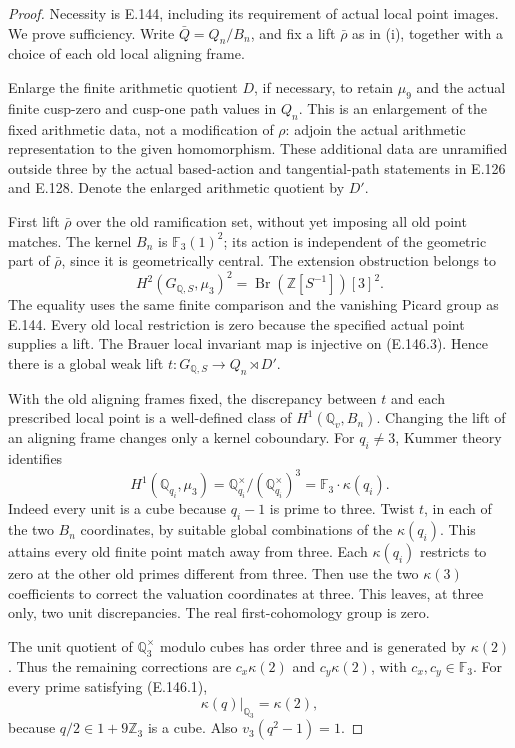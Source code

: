 \begin{proof}
Necessity is E.144, including its requirement of
actual local point images. We prove sufficiency.
Write \(\bar Q=Q_n/B_n\), and fix a lift
\(\bar\rho\) as in (i), together with a choice of
each old local aligning frame.

Enlarge the finite arithmetic quotient \(D\), if
necessary, to retain \(\mu_9\) and the actual
finite cusp-zero and cusp-one path values in
\(Q_n\). This is an enlargement of the fixed
arithmetic data, not a modification of \(\rho\):
adjoin the actual arithmetic representation to
the given homomorphism. These additional data
are unramified outside three by the actual
based-action and tangential-path statements
in E.126 and E.128. Denote the enlarged
arithmetic quotient by \(D'\).

First lift \(\bar\rho\) over the old ramification
set, without yet imposing all old point matches.
The kernel \(B_n\) is
\(\mathbb F_3(1)^2\); its action is independent
of the geometric part of \(\bar\rho\), since
it is geometrically central. The extension
obstruction belongs to
\[
 H^2(G_{\mathbb Q,S},\mu_3)^2
             =\operatorname{Br}(\mathbb Z[S^{-1}])[3]^2.
 \tag{E.146.3}
\]
The equality uses the same finite comparison and
the vanishing Picard group as E.144.
Every old local restriction is zero because the
specified actual point supplies a lift.
The Brauer local invariant map is injective on
(E.146.3). Hence there is a global weak lift
\(t:G_{\mathbb Q,S}\to Q_n\rtimes D'\).

With the old aligning frames fixed, the discrepancy
between \(t\) and each prescribed local point is
a well-defined class of \(H^1(\mathbb Q_v,B_n)\).
Changing the lift of an aligning frame changes
only a kernel coboundary. For \(q_i\ne3\),
Kummer theory identifies
\[
 H^1(\mathbb Q_{q_i},\mu_3)
    =\mathbb Q_{q_i}^{\times}/
                   (\mathbb Q_{q_i}^{\times})^3
    =\mathbb F_3\cdot\kappa(q_i).
 \tag{E.146.4}
\]
Indeed every unit is a cube because
\(q_i-1\) is prime to three.
Twist \(t\), in each of the two \(B_n\) coordinates,
by suitable global combinations of the
\(\kappa(q_i)\). This attains every old finite
point match away from three.
Each \(\kappa(q_i)\) restricts to zero at the
other old primes different from three.
Then use the two \(\kappa(3)\) coefficients to
correct the valuation coordinates at three.
This leaves, at three only, two unit discrepancies.
The real first-cohomology group is zero.

The unit quotient of \(\mathbb Q_3^\times\)
modulo cubes has order three and is generated
by \(\kappa(2)\). Thus the remaining corrections
are \(c_x\kappa(2)\) and \(c_y\kappa(2)\), with
\(c_x,c_y\in\mathbb F_3\).
For every prime satisfying (E.146.1),
\[
               \kappa(q)|_{\mathbb Q_3}=\kappa(2),
 \tag{E.146.5}
\]
because \(q/2\in1+9\mathbb Z_3\) is a cube.
Also \(v_3(q^2-1)=1\).


\end{proof}
